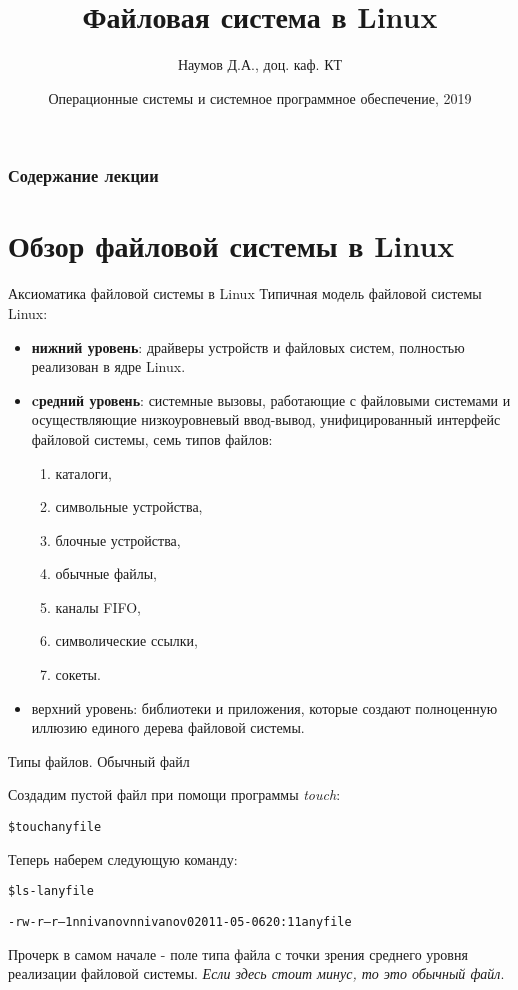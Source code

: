 \documentclass{beamer}
\title[Файловая система]{Файловая система в Linux}
\author{Наумов Д.А., доц. каф. КТ}
\date[29.10.2019] {Операционные системы и системное программное обеспечение, 2019}
\begin{document}
\begin{frame}
  \titlepage
\end{frame}
  
\begin{frame}
  \frametitle{Содержание лекции}
  \tableofcontents  
\end{frame}

\section{Обзор файловой системы в Linux}

\begin{frame}{Аксиоматика файловой системы в Linux}
Типичная модель файловой системы Linux:
\begin{itemize}
\item \textbf{нижний уровень}: драйверы устройств и файловых систем, полностью реализован в ядре Linux.
\item \textbf{cредний уровень}: системные вызовы, работающие с файловыми системами и осуществляющие низкоуровневый ввод-вывод, унифицированный интерфейс файловой системы, семь типов файлов: 
\begin{enumerate}
\item каталоги, 
\item символьные устройства, 
\item блочные устройства,
\item обычные файлы, 
\item каналы FIFO, 
\item символические ссылки,
\item сокеты.
\end{enumerate}
\item верхний уровень: библиотеки и приложения, которые создают полноценную иллюзию единого дерева файловой системы.
\end{itemize}
\end{frame}

\begin{frame}[fragile]{Типы файлов. Обычный файл}
\begin{block}{Создадим пустой файл при помощи программы \textit{touch}:}
\begin{alltt}
\$ touch anyfile
\end{alltt}
\end{block}
\begin{block}{Теперь наберем следующую команду:}
\begin{alltt}
\$ ls -l anyfile

-rw-r--r-- 1 nnivanov nnivanov 0 2011-05-06 20:11 anyfile
\end{alltt}
\end{block}
Прочерк в самом начале - поле типа файла с точки зрения среднего уровня реализации
файловой системы. \textit{Если здесь стоит минус, то это обычный файл}.
\end{frame}
\end{document}
